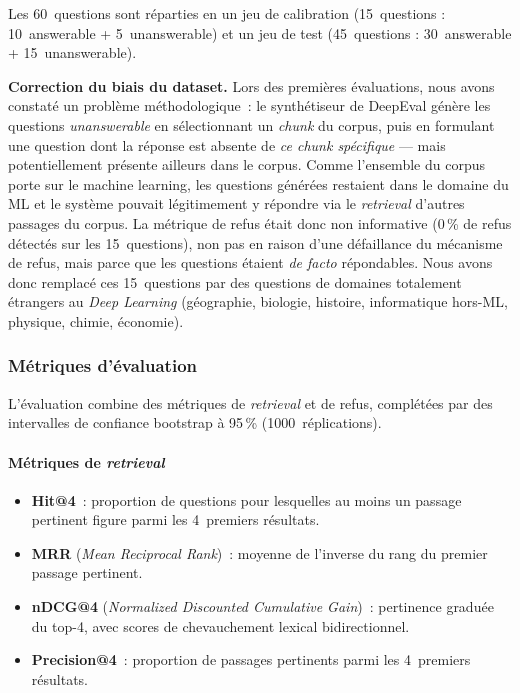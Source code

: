 \documentclass[11pt,a4paper]{article}
\begin{document}
Les 60~questions sont réparties en un jeu de calibration (15~questions : 10~answerable + 5~unanswerable) et un jeu de test (45~questions : 30~answerable + 15~unanswerable).

\textbf{Correction du biais du dataset.} Lors des premières évaluations, nous avons constaté un problème méthodologique~: le synthétiseur de DeepEval génère les questions \textit{unanswerable} en sélectionnant un \textit{chunk} du corpus, puis en formulant une question dont la réponse est absente de \textit{ce chunk spécifique} --- mais potentiellement présente ailleurs dans le corpus. Comme l'ensemble du corpus porte sur le machine learning, les questions générées restaient dans le domaine du ML et le système pouvait légitimement y répondre via le \textit{retrieval} d'autres passages du corpus. La métrique de refus était donc non informative (0\,\% de refus détectés sur les 15~questions), non pas en raison d'une défaillance du mécanisme de refus, mais parce que les questions étaient \textit{de facto} répondables. Nous avons donc remplacé ces 15~questions par des questions de domaines totalement étrangers au \textit{Deep Learning} (géographie, biologie, histoire, informatique hors-ML, physique, chimie, économie).

\subsubsection{Métriques d'évaluation}

L'évaluation combine des métriques de \textit{retrieval} et de refus, complétées par des intervalles de confiance bootstrap à 95\,\% (1000~réplications).

\paragraph{Métriques de \textit{retrieval}}

\begin{itemize}
  \item \textbf{Hit@4}~: proportion de questions pour lesquelles au moins un passage pertinent figure parmi les 4~premiers résultats.
  \item \textbf{MRR} (\textit{Mean Reciprocal Rank})~: moyenne de l'inverse du rang du premier passage pertinent.
  \item \textbf{nDCG@4} (\textit{Normalized Discounted Cumulative Gain})~: pertinence graduée du top-4, avec scores de chevauchement lexical bidirectionnel.
  \item \textbf{Precision@4}~: proportion de passages pertinents parmi les 4~premiers résultats.
\end{itemize}
\end{document}
